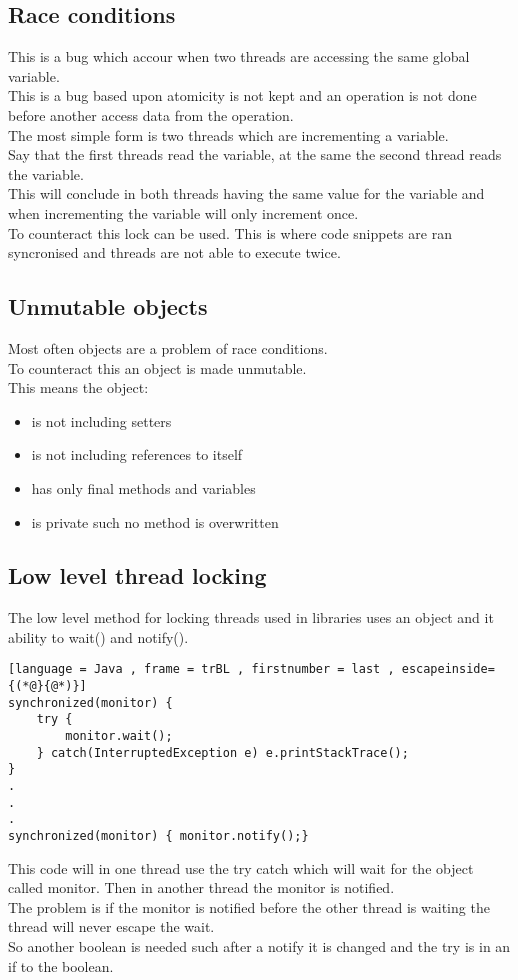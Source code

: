 \documentclass[12pt, a4paper]{article}
\begin{document}
	\subsection{Race conditions}
		This is a bug which accour when two threads are accessing the same global variable.\\
		This is a bug based upon atomicity is not kept and an operation is not done before another access data from the operation.\\
		The most simple form is two threads which are incrementing a variable.\\
		Say that the first threads read the variable, at the same the second thread reads the variable.\\
		This will conclude in both threads having the same value for the variable and when incrementing the variable will only increment once.\\
		To counteract this lock can be used. This is where code snippets are ran syncronised and threads are not able to execute twice.
	\subsection{Unmutable objects}
		Most often objects are a problem of race conditions.\\
		To counteract this an object is made unmutable.\\
		This means the object:
		\begin{itemize}
			\item is not including setters
			\item is not including references to itself
			\item has only final methods and variables
			\item is private such no method is overwritten
		\end{itemize}
	\subsection{Low level thread locking}
		The low level method for locking threads used in libraries uses an object and it ability to wait() and notify().\\
		\begin{lstlisting}[language = Java , frame = trBL , firstnumber = last , escapeinside={(*@}{@*)}]
synchronized(monitor) {
	try {
		monitor.wait();
	} catch(InterruptedException e) e.printStackTrace();
}
.
.
.
synchronized(monitor) { monitor.notify();}
		\end{lstlisting}
		This code will in one thread use the try catch which will wait for the object called monitor. Then in another thread the monitor is notified.\\
		The problem is if the monitor is notified before the other thread is waiting the thread will never escape the wait.\\
		So another boolean is needed such after a notify it is changed and the try is in an if to the boolean.
\end{document}
